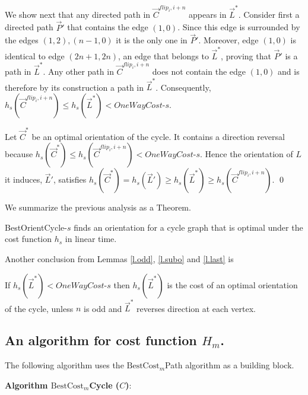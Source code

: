 	We show next that any directed path in $\vec{C}^{flip_i, i+n}$ appears in $\vec{L}^*$. Consider first a directed path $\vec{P}'$ that contains the edge $(1,0)$. 
	Since this edge is surrounded by the edges $(1,2), (n-1,0)$ it is the only one in $\vec{P}'$. Moreover, edge $(1,0)$ is identical to edge $(2n+1,2n)$, an edge that belongs to 
	$\vec{L}^*$, proving that  $\vec{P}'$ is a path in $\vec{L}^*$.
	Any other path in $\vec{C}^{flip_i, i+n}$ does not contain the edge $(1,0)$ and is therefore by its construction a path in $\vec{L}^*$. 
	Consequently, $h_s(\vec{C}^{flip_i, i+n})\leq h_s(\vec{L}^*)<\textit{OneWayCost-s}$.
	
	Let $\vec{C}^*$ be an optimal orientation of the cycle. It contains a direction reversal
	because $h_s(\vec{C}^*)\leq h_s(\vec{C}^{flip_i, i+n})<\textit{OneWayCost-s}$.
	Hence the orientation of $L$ it induces, $\vec{L}'$, satisfies
	$h_s(\vec{C}^*)=h_s(\vec{L}')\geq h_s(\vec{L}^*)\geq h_s(\vec{C}^{flip_i, i+n})$.
\qed

We summarize the previous analysis as a Theorem.
\begin{theorem}
	BestOrientCycle-$s$  finds an orientation for a cycle graph that is optimal under the cost function $h_s$ in linear time.
\end{theorem}

Another conclusion from Lemmas \ref{l.odd}, \ref{l.subo} and \ref{l.last} is
\begin{corollary}
	If $h_s(\vec{L}^*) < \textit{OneWayCost-s}$ then $h_s(\vec{L}^*)$ is the cost of an optimal orientation of the cycle, unless $n$ is odd and $\vec{L}^*$ reverses direction at each vertex.
\end{corollary}

\newpage
\subsection{An algorithm for cost function $H_m$.}
The following algorithm uses the $\mbox{BestCost}_m$Path algorithm as a building block. 

\noindent \textbf{Algorithm $\mbox{BestCost}_m$Cycle ($C$)}:

